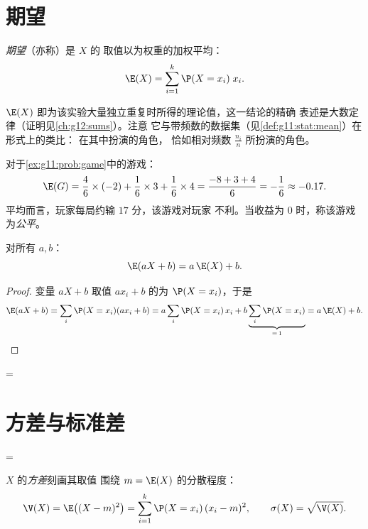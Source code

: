 \section{期望}

\begin{definition}[期望]\label{def:g11:prob:expectation}
\emph{期望}（亦称）是 $X$ 的
取值以为权重的加权平均：
\[
\E(X) = \sum_{i=1}^{k} \P(X = x_i)\; x_i .
\]
\end{definition}

\begin{remark}
$\E(X)$ 即为该实验大量独立重复时所得的理论值，这一结论的精确
表述是大数定律（证明见\cref{ch:g12:sums}）。注意
它与带频数的数据集（见\cref{def:g11:stat:mean}）在形式上的类比：
在其中扮演的角色，
恰如相对频数
$\frac{n_i}{n}$ 所扮演的角色。
\end{remark}

\begin{example}\label{ex:g11:prob:gameexp}
对于\cref{ex:g11:prob:game}中的游戏：
\[
\E(G) = \frac46 \times (-2) + \frac16 \times 3 + \frac16 \times 4
= \frac{-8 + 3 + 4}{6} = -\frac16 \approx -0.17 .
\]
平均而言，玩家每局约输 $17$ 分，该游戏对玩家
不利。当收益为 $0$ 时，称该游戏为\emph{公平}。
\end{example}

\begin{proposition}[线性性]\label{prop:g11:prob:linearity}
对所有 $a, b$：
\[
\E(aX + b) = a\,\E(X) + b .
\]
\end{proposition}

\begin{proof}
变量 $aX + b$ 取值 $a x_i + b$ 的为
$\P(X = x_i)$，于是
\[
\E(aX + b) = \sum_i \P(X = x_i)(a x_i + b)
= a \sum_i \P(X = x_i)\,x_i + b \underbrace{\sum_i \P(X =
x_i)}_{=\,1} = a\,\E(X) + b .
\]
\end{proof}

=\section{方差与标准差}

=\begin{definition}[方差]\label{def:g11:prob:variance}
$X$ 的\emph{方差}刻画其取值
围绕 $m = \E(X)$ 的分散程度：
\[
\V(X) = \E\bigl((X - m)^2\bigr)
= \sum_{i=1}^{k} \P(X = x_i)\,(x_i - m)^2,
\qquad
\sigma(X) = \sqrt{\V(X)} .
\]
\end{definition}

